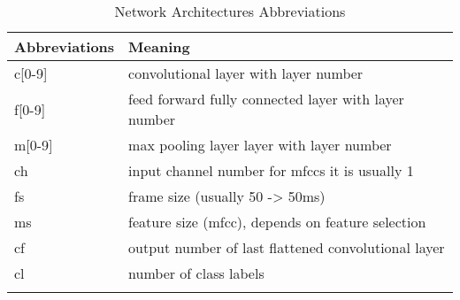 \begin{table}[ht!]
\begin{center}
\caption{Network Architectures Abbreviations}
\begin{tabular}{ M{2.5cm}  M{10cm} }
\toprule
\textbf{Abbreviations} & \textbf{Meaning}\\
\midrule
c[0-9] & convolutional layer with layer number\\
f[0-9] & feed forward fully connected layer with layer number\\
m[0-9] & max pooling layer layer with layer number\\
ch & input channel number for mfccs it is usually 1\\
fs & frame size (usually 50 -> 50ms)\\
ms & feature size (mfcc), depends on feature selection\\
cf & output number of last flattened convolutional layer\\
cl & number of class labels\\
\bottomrule
\label{tab:nn_arch_abbreviation}
\end{tabular}
\end{center}
\vspace{-4mm}
\end{table}
\FloatBarrier
\noindent